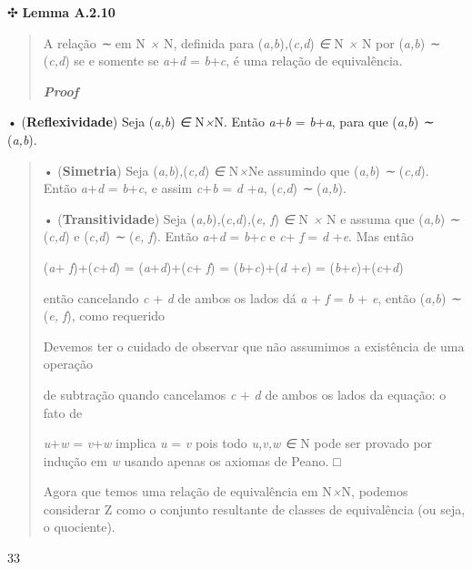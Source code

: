 \documentclass[
]{article}
\begin{document}
✣ \textbf{Lemma A.2.10}

\begin{quote}
A relação \emph{∼} em N \emph{×} N, definida para
(\emph{a,b})\emph{,}(\emph{c,d}) \emph{∈} N \emph{×} N por (\emph{a,b})
\emph{∼} (\emph{c,d}) se e somente se \emph{a}+\emph{d} =
\emph{b}+\emph{c}, é uma relação de equivalência.

\emph{\textbf{Proof}}
\end{quote}

• (\textbf{Reflexividade}) Seja (\emph{a,b}) \emph{∈} N\emph{×}N. Então
\emph{a}+\emph{b} = \emph{b}+\emph{a}, para que (\emph{a,b}) \emph{∼}
(\emph{a,b}).

\begin{quote}
• (\textbf{Simetria}) Seja (\emph{a,b})\emph{,}(\emph{c,d}) \emph{∈}
N\emph{×}Ne assumindo que (\emph{a,b}) \emph{∼} (\emph{c,d}). Então
\emph{a}+\emph{d} = \emph{b}+\emph{c}, e assim \emph{c}+\emph{b} =
\emph{d} +\emph{a}, (\emph{c,d}) \emph{∼} (\emph{a,b}).

• (\textbf{Transitividade}) Seja
(\emph{a,b})\emph{,}(\emph{c,d})\emph{,}(\emph{e, f}) \emph{∈} N
\emph{×} N e assuma que (\emph{a,b}) \emph{∼} (\emph{c,d}) e
(\emph{c,d}) \emph{∼} (\emph{e, f}). Então \emph{a}+\emph{d} =
\emph{b}+\emph{c} e \emph{c}+ \emph{f} = \emph{d} +\emph{e}. Mas então

(\emph{a}+ \emph{f})+(\emph{c}+\emph{d}) =
(\emph{a}+\emph{d})+(\emph{c}+ \emph{f}) = (\emph{b}+\emph{c})+(\emph{d}
+\emph{e}) = (\emph{b}+\emph{e})+(\emph{c}+\emph{d})

então cancelando \emph{c} + \emph{d} de ambos os lados dá \emph{a} +
\emph{f} = \emph{b} + \emph{e}, então (\emph{a,b}) \emph{∼} (\emph{e,
f}), como requerido

Devemos ter o cuidado de observar que não assumimos a existência de uma
operação

de subtração quando cancelamos \emph{c} + \emph{d} de ambos os lados da
equação: o fato de

\emph{u}+\emph{w} = \emph{v}+\emph{w} implica \emph{u} = \emph{v} pois
todo \emph{u,v,w ∈} N pode ser provado por indução em \emph{w} usando
apenas os axiomas de Peano. □

Agora que temos uma relação de equivalência em N\emph{×}N, podemos
considerar Z como o conjunto resultante de classes de equivalência (ou
seja, o quociente).
\end{quote}

33
\end{document}
